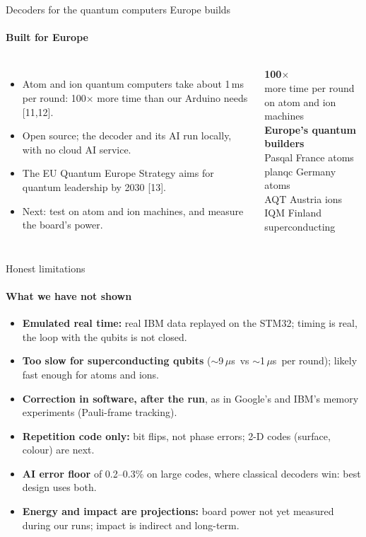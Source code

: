 \documentclass[aspectratio=169,11pt]{beamer}
\newcommand{\us}{\,$\mu$s}
\newcommand{\good}[1]{{\color{green}#1}}
\newcommand{\dimnote}[1]{{\color{dim}\small #1}}
\newcommand{\bignum}[2]{{\color{#1}\fontsize{40}{44}\selectfont\bfseries #2}}
\begin{document}
\begin{frame}{Decoders for the quantum computers Europe builds}\framesubtitle{Built for Europe}
  \begin{columns}[c]
    \begin{itemize}\setlength\itemsep{0.7em}
      \item Atom and ion quantum computers take about 1\,ms per round: \good{100$\times$ more time} than our Arduino needs [11,12].
      \item Open source; the decoder and its AI run locally, with no cloud AI service.
      \item The EU Quantum Europe Strategy aims for quantum leadership by 2030 [13].
      \item \dimnote{Next: test on atom and ion machines, and measure the board's power.}
    \end{itemize}
    \centering
    \bignum{green}{100$\times$}\\ \dimnote{more time per round on atom and ion machines}\\[1em]
    {\color{accent}\bfseries Europe's quantum builders}\\[0.3em]
    {\small Pasqal \textperiodcentered{} France \textperiodcentered{} atoms\\
    planqc \textperiodcentered{} Germany \textperiodcentered{} atoms\\
    AQT \textperiodcentered{} Austria \textperiodcentered{} ions\\
    IQM \textperiodcentered{} Finland \textperiodcentered{} superconducting}
  \end{columns}
\end{frame}

\begin{frame}{Honest limitations}\framesubtitle{What we have not shown}
  \begin{itemize}\setlength\itemsep{0.6em}
    \item \textbf{Emulated real time:} real IBM data replayed on the STM32; timing is real, the loop with the qubits is not closed.
    \item \textbf{Too slow for superconducting qubits} ($\sim$9\us\ vs $\sim$1\us\ per round); likely fast enough for atoms and ions.
    \item \textbf{Correction in software, after the run}, as in Google's and IBM's memory experiments (Pauli-frame tracking).
    \item \textbf{Repetition code only:} bit flips, not phase errors; 2-D codes (surface, colour) are next.
    \item \textbf{AI error floor} of 0.2--0.3\% on large codes, where classical decoders win: best design uses both.
    \item \textbf{Energy and impact are projections:} board power not yet measured during our runs; impact is indirect and long-term.
  \end{itemize}
\end{frame}
\end{document}
